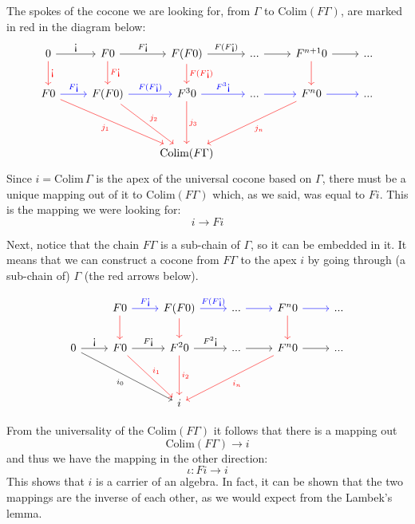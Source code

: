 \documentclass[DaoFP]{subfiles}
\begin{document}
The spokes of the cocone we are looking for, from $\Gamma$ to $\text{Colim} (F \Gamma)$, are marked in red in the diagram below:
\[
 \begin{tikzcd}
 0
 \arrow[r, "\mbox{!`}"]
 \arrow[d, red, "\mbox{!`}"]
 & F 0
  \arrow[r, "F\mbox{!`}"]
  \arrow[d, red, "F\mbox{!`}"]
& F (F 0)
  \arrow[r, "F(F\mbox{!`})"]
  \arrow[d, red, "F(F\mbox{!`})"]
 & ...
 \arrow[r]
 & F^{n+1} 0
  \arrow[r]
  \arrow[d, red]
 & ...
 \\
 F 0
 \arrow[r, blue, "F \mbox{!`}"]
 \arrow[ddrr, red, "j_1"']
 &  F (F 0)
  \arrow[r, blue, "F(F  \mbox{!`})"]
 \arrow[ddr, red, "j_2"]
& F^3 0
  \arrow[r, blue, "F^3\mbox{!`}"]
  \arrow[dd, red, "j_3"]
 & ...
 \arrow[r, blue]
 & F^n 0
  \arrow[r, blue]
 \arrow[ddll, red, "j_n"]
 & ...
 \\
 \\
 &&\text{Colim} (F \Gamma)
  \end{tikzcd}
\]
Since $i = \text{Colim}\, \Gamma$ is the apex of the universal cocone based on $\Gamma$, there must be a unique mapping out of it to $\text{Colim} (F \Gamma)$ which, as we said, was equal to $F i$. This is the mapping we were looking for:
\[ i \to F i \]

Next, notice that the chain $F \Gamma$ is a sub-chain of $\Gamma$, so it can be embedded in it. It means that we can construct a cocone from $F \Gamma$ to the apex $i$ by going through (a sub-chain of) $\Gamma$ (the red arrows below). 

\[
 \begin{tikzcd}
 & F 0
  \arrow[r, blue, "F\mbox{!`}"]
  \arrow[d, red]
& F (F 0)
  \arrow[r, blue, "F(F\mbox{!`})"]
  \arrow[d, red]
 & ...
 \arrow[r, blue]
 & F^{n} 0
  \arrow[r, blue]
  \arrow[d, red]
 & ...
 \\
  0
 \arrow[r, "\mbox{!`}"]
 \arrow[ddrr,  "i_0"']
 &  F 0
  \arrow[r, "F  \mbox{!`}"]
 \arrow[ddr, red, "i_1"]
& F^2 0
  \arrow[r, "F^2\mbox{!`}"]
  \arrow[dd, red, "i_2"]
 & ...
 \arrow[r]
 & F^n 0
  \arrow[r]
 \arrow[ddll, red, "i_n"]
 & ...
 \\
 \\
 &&i
  \end{tikzcd}
\]

From the universality of the $\text{Colim} (F \Gamma)$ it follows that there is a mapping out 
\[\text{Colim} (F \Gamma) \to i \]
and thus we have the mapping in the other direction:
\[ \iota \colon F i \to i \]
This shows that $i$ is a carrier of an algebra. In fact, it can be shown that the two mappings are the inverse of each other, as we would expect from the Lambek's lemma.
\end{document}
